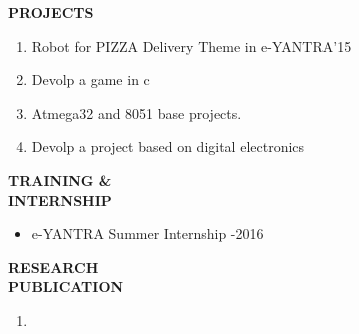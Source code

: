 \documentclass{article}
\begin{document}
 \begin{flushleft} 
 	\vspace{0.2in}
 	\textbf{PROJECTS}
 	\begin{enumerate}
 		\vspace{-0.29in}
 		\addtolength{\itemindent}{1.359in}
 		\item  Robot for PIZZA Delivery Theme in e-YANTRA'15
 		\item  Devolp a game in c
 		\item  Atmega32 and 8051 base projects.
 		\item Devolp a project based on digital electronics
 	\end{enumerate}
 \end{flushleft} 
 
  \begin{flushleft} 
  	\vspace{0.4in}
  	\textbf{TRAINING \& \\ INTERNSHIP}
  	\begin{itemize}
  		\vspace{-0.44in}
  		\addtolength{\itemindent}{1.359in}
  		\item  e-YANTRA Summer Internship -2016
  	\end{itemize}
  \end{flushleft}
  
  \begin{flushleft} 
  	\vspace{0.4in}
  	\textbf{RESEARCH \\ PUBLICATION}
  	\begin{enumerate}
  		\vspace{-0.45in}
  		\addtolength{\itemindent}{1.359in}
  		\item  
  	\end{enumerate}
  \end{flushleft}
  
\end{document}
